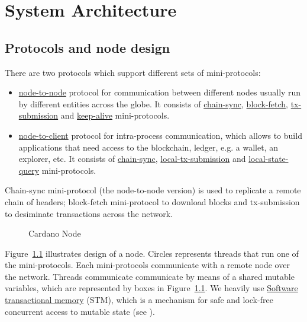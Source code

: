 \chapter{System Architecture}

\section{Protocols and node design}
There are two protocols which support different sets of mini-protocols:
\begin{itemize}
  \item\hyperref[table:node-to-node-protocol-numbers]{node-to-node} protocol
    for communication between different nodes usually run by different
    entities across the globe.  It consists of
    \hyperref[chain-sync-protocol]{chain-sync},
    \hyperref[block-fetch-protocol]{block-fetch},
    \hyperref[tx-submission-protocol]{tx-submission} and
    \hyperref[keep-alive-protocol]{keep-alive} mini-protocols.
  \item\hyperref[table:node-to-client-protocol-numbers]{node-to-client}
    protocol for intra-process communication, which allows to build
    applications that need access to the blockchain, ledger, e.g. a wallet, an
    explorer, etc.  It consists of \hyperref[chain-sync-protocol]{chain-sync},
    \hyperref[local-tx-submission-protocol]{local-tx-submission} and
    \hyperref[local-state-query-protocol]{local-state-query} mini-protocols.
\end{itemize}

Chain-sync mini-protocol (the node-to-node version) is used to replicate
a remote chain of headers; block-fetch mini-protocol to download blocks and
tx-submission to desiminate transactions across the network.

\begin{figure}
  \begin{center}
  \end{center}
  \caption{Cardano Node}
  \label{node-diagram-concurrency}
\end{figure}

Figure~\ref{node-diagram-concurrency} illustrates design of a node.  Circles
represents threads that run one of the mini-protocols.  
Each mini-protocols communicate with a remote node over the network.
Threads communicate communicate by means of a shared mutable variables, which
are represented by boxes in Figure~\ref{node-diagram-concurrency}.
We heavily use
\href{https://en.wikipedia.org/wiki/Software_transactional_memory}{Software
transactional memory} (STM), which is a mechanism for safe and lock-free
concurrent access to mutable state (see \cite{stm:harris2006}).

